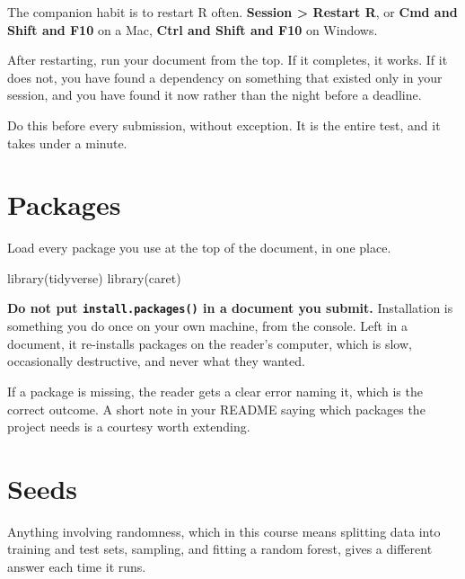 \documentclass[
  a4paper,
]{scrbook}
\newenvironment{Shaded}{\begin{snugshade}}{\end{snugshade}}
\newcommand{\FunctionTok}[1]{\textcolor[rgb]{0.28,0.35,0.67}{#1}}
\newcommand{\NormalTok}[1]{\textcolor[rgb]{0.00,0.23,0.31}{#1}}
\begin{document}

The companion habit is to restart R often. \textbf{Session
\textgreater{} Restart R}, or \textbf{Cmd and Shift and F10} on a Mac,
\textbf{Ctrl and Shift and F10} on Windows.

After restarting, run your document from the top. If it completes, it
works. If it does not, you have found a dependency on something that
existed only in your session, and you have found it now rather than the
night before a deadline.

Do this before every submission, without exception. It is the entire
test, and it takes under a minute.

\section*{Packages}\label{packages}


Load every package you use at the top of the document, in one place.

\begin{Shaded}
\begin{Highlighting}[]
\FunctionTok{library}\NormalTok{(tidyverse)}
\FunctionTok{library}\NormalTok{(caret)}
\end{Highlighting}
\end{Shaded}

\textbf{Do not put \texttt{install.packages()} in a document you
submit.} Installation is something you do once on your own machine, from
the console. Left in a document, it re-installs packages on the reader's
computer, which is slow, occasionally destructive, and never what they
wanted.

If a package is missing, the reader gets a clear error naming it, which
is the correct outcome. A short note in your README saying which
packages the project needs is a courtesy worth extending.

\section*{Seeds}\label{seeds}


Anything involving randomness, which in this course means splitting data
into training and test sets, sampling, and fitting a random forest,
gives a different answer each time it runs.
\end{document}
